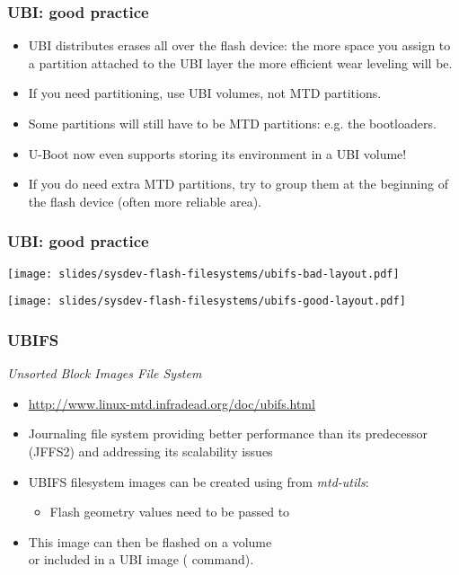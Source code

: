 \begin{frame}
  \frametitle{UBI: good practice}
  \begin{itemize}
  \item UBI distributes erases all over the flash device: the more space
    you assign to a partition attached to the UBI layer the more efficient
    wear leveling will be.
  \item If you need partitioning, use UBI volumes, not MTD partitions.
  \item Some partitions will still have to be MTD partitions: e.g. the
    bootloaders.
  \item U-Boot now even supports storing its environment in a UBI volume!
  \item If you do need extra MTD partitions, try to group them at the
    beginning of the flash device (often more reliable area).
  \end{itemize}
\end{frame}

\begin{frame}
  \frametitle{UBI: good practice}
  \begin{center}
    \texttt{[image: slides/sysdev-flash-filesystems/ubifs-bad-layout.pdf]}
  \end{center}

  \begin{center}
    \texttt{[image: slides/sysdev-flash-filesystems/ubifs-good-layout.pdf]}
  \end{center}
\end{frame}

\begin{frame}
  \frametitle{UBIFS}
  {\em Unsorted Block Images File System}
  \begin{itemize}
  \item \url{http://www.linux-mtd.infradead.org/doc/ubifs.html}
  \item Journaling file system providing better performance than
        its predecessor (JFFS2) and addressing its scalability issues
  \item UBIFS filesystem images can be created using 
        from {\em mtd-utils}:\\
      \begin{itemize}
        \item Flash geometry values need to be passed to 
      \end{itemize}
  \item This image can then be flashed on a volume\\
        or included in a UBI image ( command).
  \end{itemize}
\end{frame}

